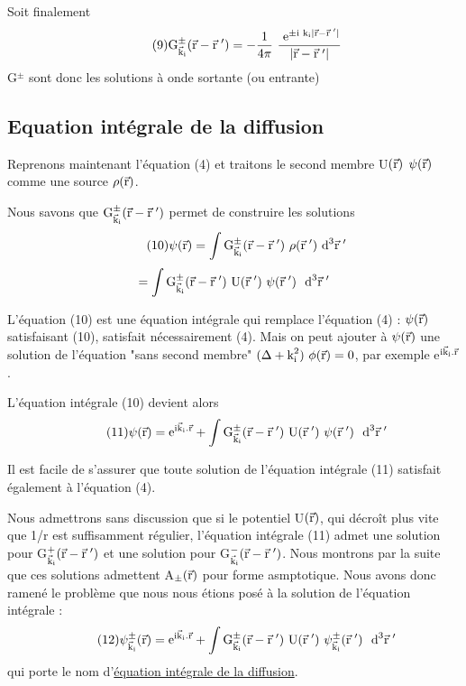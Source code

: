 Soit finalement
\[
\tag{9}\mt{G}_{\vec{\mt{k}}_\mt{i}}^\pm(\vec{\mt{r}}-\vec{\mt{r}}\;')=-\frac{1}{4\pi}\ \frac{\mt{ e}^{\pm\mt{i k}_\mt{i}|\vec{\mt{r}}-\vec{\mt{r}}\;'|}}{|\vec{\mt{r}}-\vec{\mt{r}}\;'|}
\]
G$^\pm$ sont donc les solutions à onde sortante (ou entrante)

\subsection{Equation intégrale de la diffusion}%
Reprenons maintenant l'équation (4) et traitons le second
membre U$(\vec{\text{r}})$ $\psi(\vec{\text{r}})$ comme une source $\rho(\vec{\text{r}})$.

Nous savons que $\text{G}_{\vec{\text{k}}_{\text{i}}}^\pm(\vec{\text{r}}-\vec{\text{r}}\;')$ permet de construire les solutions
\[
\tag{10}\psi(\vec{\mt{r}})=\int\mt{G}_{\vec{\mt{k}}_\mt{i}}^\pm(\vec{\mt{r}}-\vec{\mt{r}}\;')\ \rho(\vec{\mt{r}}\;')\mt{ d}^3\vec{\mt{r}}\;'
\]
\[
=\int\text{G}_{\vec{\text{k}}_{\text{i}}}^\pm(\vec{\text{r}}-\vec{\text{r}}\;')\text{ U}(\vec{\text{r}}\;')\ \psi(\vec{\text{r}}\;')\ \text{ d}^3\vec{\text{r}}\;'
\]

L'équation (10) est une équation intégrale qui remplace
l'équation (4) : $\psi(\vec{\text{r}})$ satisfaisant (10), satisfait nécessairement (4).
Mais on peut ajouter à $\psi(\vec{\text{r}})$ une solution de l'équation "sans second
membre" $(\Delta+\mt{k}_\mt{i}^2)\ \phi(\vec{\mt{r}})=0$, par exemple e$^{\text{i}\vec{\text{k}}_{\text{i}}.\vec{\text{r}}}$.

L'équation intégrale (10) devient alors
\[
\tag{11}\psi(\vec{\text{r}})=\text{e}^{\text{i}\vec{\text{k}}_{\text{i}}.\vec{\text{r}}}+\int\text{G}_{\vec{\text{k}}_{\text{i}}}^\pm(\vec{\text{r}}-\vec{\text{r}}\;')\text{ U}(\vec{\text{r}}\;')\ \psi(\vec{\text{r}}\;')\ \text{ d}^3\vec{\text{r}}\;'
\]

Il est facile de s'assurer que toute solution de l'équation
intégrale (11) satisfait également à l'équation (4).

Nous admettrons sans discussion que si le potentiel U$(\vec{\text{r}})$,
qui décroît plus vite que 1/r est suffisamment régulier, l'équation intégrale (11)
admet une solution pour G$_{\vec{\text{k}}_{\text{i}}}^+(\vec{\text{r}}-\vec{\text{r}}\;')$ et une solution pour
G$_{\vec{\text{k}}_{\text{i}}}^-(\vec{\text{r}}-\vec{\text{r}}\;')$. Nous montrons par la suite que ces solutions admettent
A$_\pm(\vec{\text{r}})$ pour forme asmptotique. Nous avons donc ramené le problème que
nous nous étions posé à la solution de l'équation intégrale :
\[
\tag{12}\psi_{\vec{\mt{k}}_\mt{i}}^\pm(\vec{\mt{r}})=\mt{e}^{\mt{i}\vec{\mt{k}}_\mt{i}.\vec{\mt{r}}}+\int\mt{G}_{\vec{\mt{k}}_\mt{i}}^\pm(\vec{\mt{r}}-\vec{\mt{r}}\;')\mt{ U}(\vec{\mt{r}}\;')\ \psi_{\vec{\mt{k}}_\mt{i}}^\pm(\vec{\mt{r}}\;')\ \mt{ d}^3\vec{\mt{r}}\;'
\]
qui porte le nom d'\ul{équation intégrale de la diffusion}.


